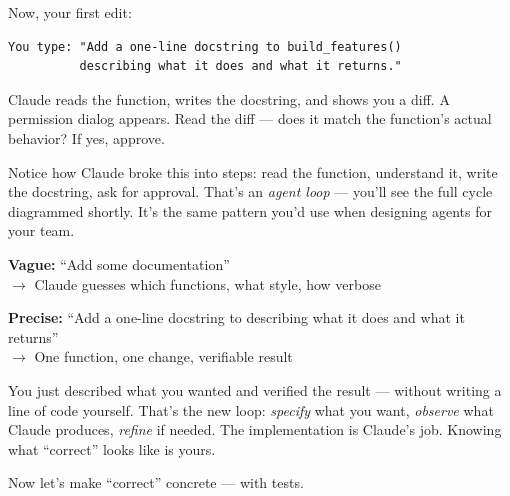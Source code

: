 \documentclass[10pt,oneside]{scrartcl}
\begin{document}
Now, your first edit:

\begin{verbatim}
You type: "Add a one-line docstring to build_features()
          describing what it does and what it returns."
\end{verbatim}


Claude reads the function, writes the docstring, and shows you a diff. A permission dialog appears. Read the diff --- does it match the function's actual behavior? If yes, approve.

\begin{tipbox}
Notice how Claude broke this into steps: read the function, understand it, write the docstring, ask for approval. That's an \emph{agent loop} --- you'll see the full cycle diagrammed shortly. It's the same pattern you'd use when designing agents for your team.
\end{tipbox}


\begin{warnbox}
\textbf{Vague:} ``Add some documentation''\\
\hspace*{1em}$\rightarrow$ Claude guesses which functions, what style, how verbose

\textbf{Precise:} ``Add a one-line docstring to  describing what it does and what it returns''\\
\hspace*{1em}$\rightarrow$ One function, one change, verifiable result
\end{warnbox}

\begin{whybox}
You just described what you wanted and verified the result --- without writing a line of code yourself. That's the new loop: \emph{specify} what you want, \emph{observe} what Claude produces, \emph{refine} if needed. The implementation is Claude's job. Knowing what ``correct'' looks like is yours.

Now let's make ``correct'' concrete --- with tests.
\end{whybox}
\end{document}
